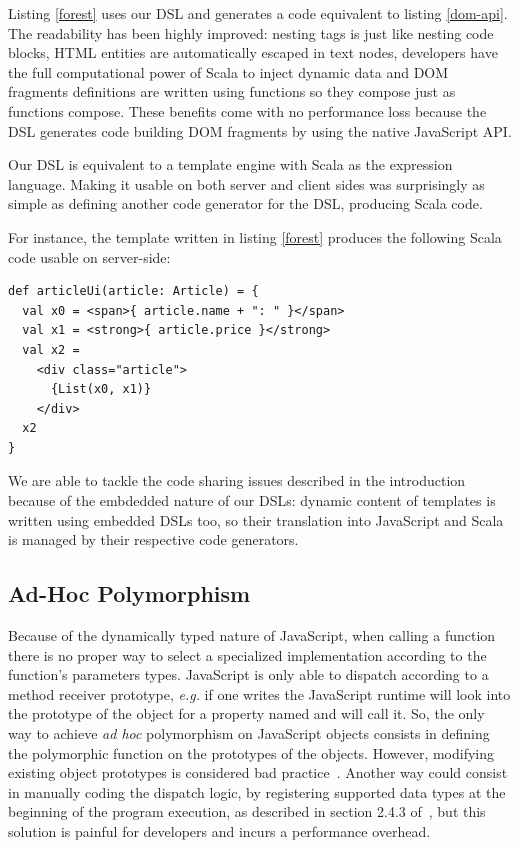 \documentclass[preprint]{sigplanconf}
\newcommand{\eg}{\emph{e.g.}}
\begin{document}
Listing \ref{forest} uses our DSL and generates a code equivalent to listing \ref{dom-api}. The readability has
been highly improved: nesting tags is just like nesting code blocks, HTML entities are
automatically escaped in text nodes, developers have the full computational power of Scala to inject dynamic data and
DOM fragments definitions are written using functions so they compose just as functions compose. These benefits come
with no performance loss because the DSL generates code building DOM fragments by using the native JavaScript API.

Our DSL is equivalent to a template engine with Scala as the expression language. Making it usable on both server and
client sides was surprisingly as simple as defining another code generator for the DSL, producing Scala code.

For instance, the template written in listing \ref{forest} produces the following Scala code usable on
server-side:

\begin{lstlisting}
def articleUi(article: Article) = {
  val x0 = <span>{ article.name + ": " }</span>
  val x1 = <strong>{ article.price }</strong>
  val x2 =
    <div class="article">
      {List(x0, x1)}
    </div>
  x2
}
\end{lstlisting}

We are able to tackle the code sharing issues described in the introduction because of the embdedded nature
of our DSLs: dynamic content of templates is written using embedded DSLs too, so their translation into JavaScript
and Scala is managed by their respective code generators.

\subsection{Ad-Hoc Polymorphism}

Because of the dynamically typed nature of JavaScript, when calling a function there is no proper way to select a
specialized implementation according to the function’s parameters types. JavaScript is only able to dispatch
according to a method receiver prototype, \eg{} if one writes  the JavaScript runtime will look into
the prototype of the  object for a property named  and will call it. So, the only way to achieve
\emph{ad hoc} polymorphism on JavaScript objects consists in defining the polymorphic function on the prototypes of
the objects. However, modifying existing object prototypes is considered bad
practice~\cite{Zakas12_MaintainableJs}. Another way could consist in manually coding the dispatch logic, by
registering supported data types at the beginning of the program execution, as described in section 2.4.3
of~\cite{Abelson83_SICP}, but this solution is painful for developers and incurs a performance overhead.
\end{document}
